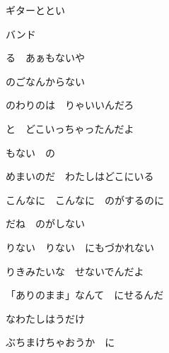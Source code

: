 \documentclass[a4paper,tate,twocolumn,12pt]{ltjtarticle}
\begin{document}
\thispagestyle{empty}

\begin{center}
{\LARGE ギターととい}

{\large {}バンド}
\end{center}

\vspace{1em}

\begin{flushleft}

\noindent\begin{minipage}{\linewidth}
る　あぁもないや

のごなんからない

のわりのは　りゃいいんだろ

と　どこいっちゃったんだよ
\end{minipage}

\vspace{2em}

\noindent\begin{minipage}{\linewidth}
もない　の

めまいのだ　わたしはどこにいる

こんなに　こんなに　のがするのに

だね　のがしない
\end{minipage}

\vspace{2em}

\noindent\begin{minipage}{\linewidth}
りない　りない　にもづかれない

りきみたいな　せないでんだよ

「ありのまま」なんて　にせるんだ

なわたしはうだけ

ぶちまけちゃおうか　に
\end{minipage}


\end{flushleft}
\end{document}
